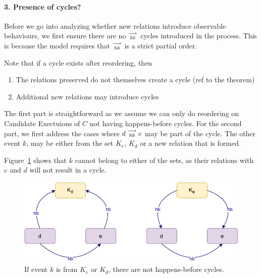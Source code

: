 
\paragraph{3. Presence of cycles?}
    Before we go into analyzing whether new relations introduce observable behaviours, we first ensure there are no $\stackrel{\longrightarrow}{_\textit{hb}}$ cycles introduced in the process. This is because the model requires that $\stackrel{\longrightarrow}{_{hb}}$ is a strict partial order. 
    
    Note that if a cycle exists after reordering, then 
    \begin{enumerate}
        \item The relations preserved do not themselves create a cycle (ref to the theorem)
        \item Additional new relations may introduce cycles
    \end{enumerate}

    The first part is straightforward as we assume we can only do reordering on Candidate Exectuions of $C$ not having happens-before cycles. 
    For the second part, we first address the cases where $d\stackrel{\longrightarrow}{_{hb}}e$ may be part of the cycle. 
    The other event $k$, may be either from the set $K_e$, $K_d$ or a new relation that is formed\footnotemark.

    
    Figure~\ref{reord:cycle(a)} shows that $k$ cannot belong to either of the sets, as their relations with $e$ and $d$ will not result in a cycle. 
    \begin{figure}[H]
        \centering
        \includegraphics[scale=0.7]{5.InstructionReordering/4.ValidReorderingCandidate/ProofParts/Part3/part3(b).pdf}
        \caption{If event $k$ is from $K_e$ or $K_d$, there are not happens-before cycles.}
        \label{reord:cycle(a)}
    \end{figure}

